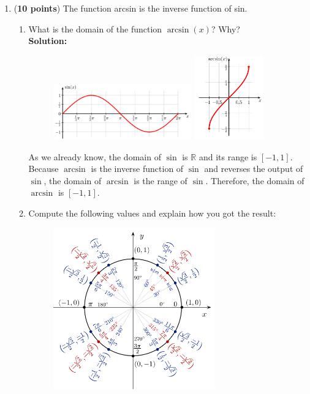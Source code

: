 \documentclass[a4paper]{article}
\begin{document}
\begin{enumerate}

\item (\textbf{10 points}) The function arcsin is the inverse function of sin.

\begin{enumerate}
	\item What is the domain of the function $\arcsin(x)$? Why?\\
	\textbf{Solution:}\\
	
\begin{figure}[ht]
  \includegraphics[width=0.6\textwidth]{sine.png}
  \includegraphics[width=0.3\textwidth]{arcsine.png}
\end{figure}	
	
	
As we already know, the domain of $\sin$ is $\mathbb{R}$ and its range is $[-1,1]$. Because $\arcsin$ is the inverse function of $\sin$ and reverses the output of $\sin$, the domain of $\arcsin$ is the range of $\sin$. Therefore, the domain of $\arcsin$ is $[-1,1]$.
	

\newpage

	
	
	\item Compute the following values and explain how you got the result:\\
	
\begin{figure}[ht!]
	\centering
  \includegraphics[width=0.7\textwidth]{unitcircle.png}
\end{figure}	


\end{enumerate}
\end{enumerate}
\end{document}
